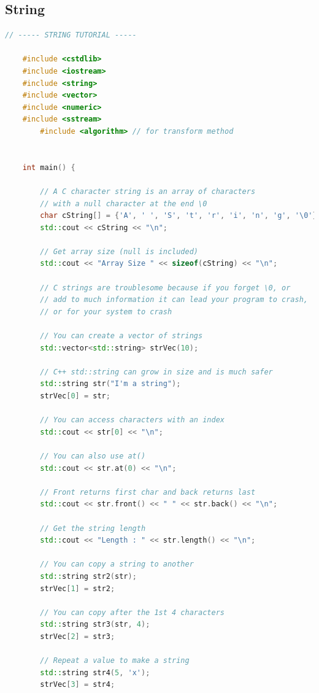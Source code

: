 \documentclass[12pt , a4paper]{article}
\begin{document}
	\subsection{String}
	\begin{lstlisting}[language=C++]
	// ----- STRING TUTORIAL -----
	
	#include <cstdlib>
	#include <iostream>
	#include <string>
	#include <vector>
	#include <numeric>
	#include <sstream>
    	#include <algorithm> // for transform method
	
	
	int main() {
	
	    // A C character string is an array of characters
	    // with a null character at the end \0
	    char cString[] = {'A', ' ', 'S', 't', 'r', 'i', 'n', 'g', '\0'};
	    std::cout << cString << "\n";
	    
	    // Get array size (null is included)
	    std::cout << "Array Size " << sizeof(cString) << "\n";
	    
	    // C strings are troublesome because if you forget \0, or
	    // add to much information it can lead your program to crash,
	    // or for your system to crash
	    
	    // You can create a vector of strings
	    std::vector<std::string> strVec(10);
	    
	    // C++ std::string can grow in size and is much safer
	    std::string str("I'm a string");
	    strVec[0] = str;
	    
	    // You can access characters with an index
	    std::cout << str[0] << "\n";
	    
	    // You can also use at()
	    std::cout << str.at(0) << "\n";
	    
	    // Front returns first char and back returns last
	    std::cout << str.front() << " " << str.back() << "\n";
	    
	    // Get the string length
	    std::cout << "Length : " << str.length() << "\n";
	    
	    // You can copy a string to another
	    std::string str2(str);
	    strVec[1] = str2;
	    
	    // You can copy after the 1st 4 characters
	    std::string str3(str, 4);
	    strVec[2] = str3;
	    
	    // Repeat a value to make a string
	    std::string str4(5, 'x');
	    strVec[3] = str4;
	    

\end{lstlisting}
\end{document}
